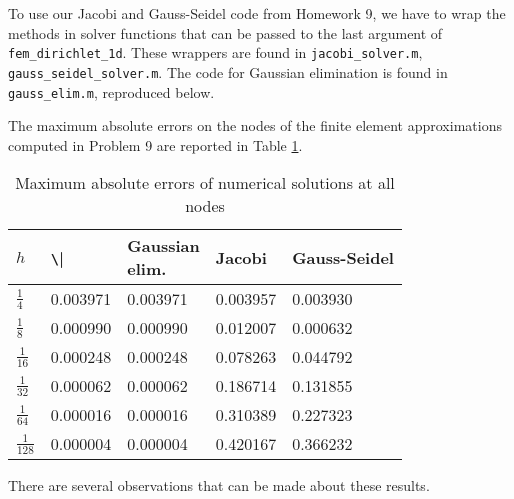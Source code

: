 \documentclass{homework}
\begin{document}
	\question
	To use our Jacobi and Gauss-Seidel code from Homework 9, we have to wrap the methods in solver functions that can be passed to the last argument of \verb*|fem_dirichlet_1d|. These wrappers are found in \verb*|jacobi_solver.m|, \verb*|gauss_seidel_solver.m|. The code for Gaussian elimination is found in \verb*|gauss_elim.m|, reproduced below.
	
	
	\question
	The maximum absolute errors on the nodes of the finite element approximations computed in Problem 9 are reported in Table \ref{table:p9}.
	\begin{table}[h]
		\centering
		\begin{tabular}{@{}lllll@{}}
			\toprule
			$h$ & \verb*|\| & \makecell{Gaussian \\ elim.} & Jacobi & Gauss-Seidel \\
			\midrule
			$\frac{1}{4}$ & 0.003971 & 0.003971 & 0.003957 & 0.003930 \\[.4em]
			$\frac{1}{8}$ & 0.000990 & 0.000990 & 0.012007 & 0.000632 \\[.4em]
			$\frac{1}{16}$ & 0.000248 & 0.000248 & 0.078263 & 0.044792 \\[.4em]
			$\frac{1}{32}$ & 0.000062 & 0.000062 & 0.186714 & 0.131855 \\[.4em]
			$\frac{1}{64}$ & 0.000016 & 0.000016 & 0.310389 & 0.227323 \\[.4em]
			$\frac{1}{128}$ & 0.000004 & 0.000004 & 0.420167 & 0.366232 \\[.4em]
			\bottomrule
		\end{tabular}
		\caption{Maximum absolute errors of numerical solutions at all nodes}
		\label{table:p9}
	\end{table}
	There are several observations that can be made about these results.
\end{document}
